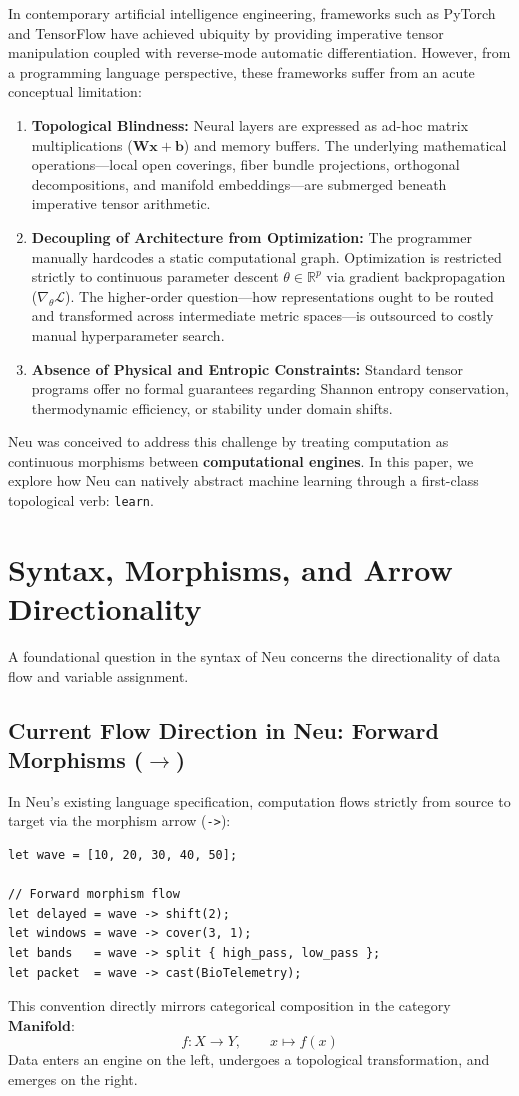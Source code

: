 \documentclass[11pt]{article}
\begin{document}
In contemporary artificial intelligence engineering, frameworks such as PyTorch and TensorFlow have achieved ubiquity by providing imperative tensor manipulation coupled with reverse-mode automatic differentiation. However, from a programming language perspective, these frameworks suffer from an acute conceptual limitation:
\begin{enumerate}
    \item \textbf{Topological Blindness:} Neural layers are expressed as ad-hoc matrix multiplications ($\mathbf{W}\mathbf{x} + \mathbf{b}$) and memory buffers. The underlying mathematical operations---local open coverings, fiber bundle projections, orthogonal decompositions, and manifold embeddings---are submerged beneath imperative tensor arithmetic.
    \item \textbf{Decoupling of Architecture from Optimization:} The programmer manually hardcodes a static computational graph. Optimization is restricted strictly to continuous parameter descent $\theta \in \mathbb{R}^p$ via gradient backpropagation ($\nabla_\theta \mathcal{L}$). The higher-order question---how representations ought to be routed and transformed across intermediate metric spaces---is outsourced to costly manual hyperparameter search.
    \item \textbf{Absence of Physical and Entropic Constraints:} Standard tensor programs offer no formal guarantees regarding Shannon entropy conservation, thermodynamic efficiency, or stability under domain shifts.
\end{enumerate}

Neu was conceived to address this challenge by treating computation as continuous morphisms between \textbf{computational engines}. In this paper, we explore how Neu can natively abstract machine learning through a first-class topological verb: \texttt{learn}.

\section{Syntax, Morphisms, and Arrow Directionality}

A foundational question in the syntax of Neu concerns the directionality of data flow and variable assignment.

\subsection{Current Flow Direction in Neu: Forward Morphisms (\texorpdfstring{$\to$}{->})}
In Neu's existing language specification, computation flows strictly from source to target via the morphism arrow (\texttt{->}):
\begin{lstlisting}[language=neu]
let wave = [10, 20, 30, 40, 50];

// Forward morphism flow
let delayed = wave -> shift(2);
let windows = wave -> cover(3, 1);
let bands   = wave -> split { high_pass, low_pass };
let packet  = wave -> cast(BioTelemetry);
\end{lstlisting}
This convention directly mirrors categorical composition in the category $\mathbf{Manifold}$:
$$f: X \to Y, \qquad x \mapsto f(x)$$
Data enters an engine on the left, undergoes a topological transformation, and emerges on the right.
\end{document}
